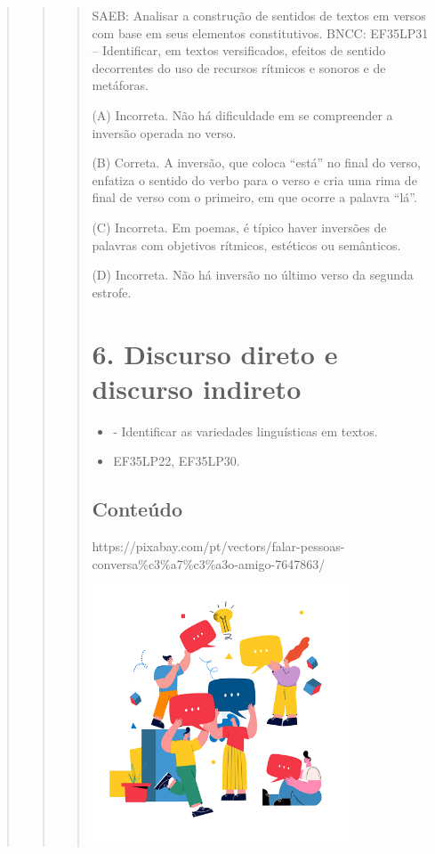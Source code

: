 \begin{quote}
\begin{quote}
\begin{quote}
SAEB: Analisar a construção de sentidos de textos em versos com base em seus elementos constitutivos.
BNCC: EF35LP31 -- Identificar, em textos versificados, efeitos de sentido
decorrentes do uso de recursos rítmicos e sonoros e de metáforas.

(A) Incorreta. Não há dificuldade em se compreender a inversão operada no verso.

(B) Correta. A inversão, que coloca ``está'' no final do verso, enfatiza o sentido do verbo para o verso e cria uma rima de final de verso com o primeiro, em que ocorre a palavra ``lá''.

(C) Incorreta. Em poemas, é típico haver inversões de palavras com objetivos rítmicos, estéticos ou semânticos.

(D) Incorreta. Não há inversão no último verso da segunda estrofe.

\section{6. Discurso direto e discurso indireto}\label{muxf3dulo-6}


\begin{itemize}
  \item - Identificar as variedades linguísticas em textos.
\end{itemize}


\begin{itemize}
  \item EF35LP22, EF35LP30.
\end{itemize}

\subsection{Conteúdo}\label{conteuxfado-5}

https://pixabay.com/pt/vectors/falar-pessoas-conversa\%c3\%a7\%c3\%a3o-amigo-7647863/

\includegraphics[width=3.01042in,height=3.01042in]{media/image18.png}


\end{quote}
\end{quote}
\end{quote}
